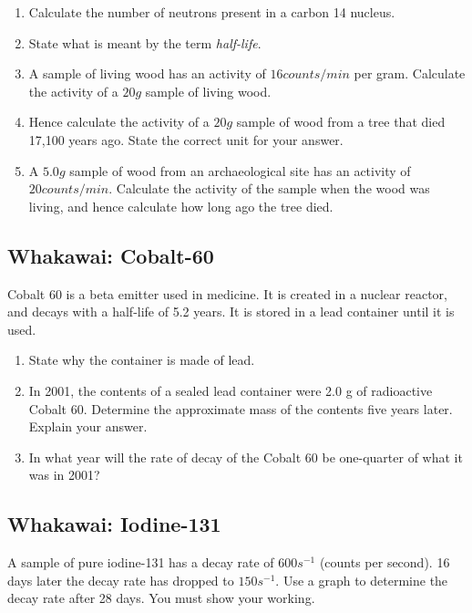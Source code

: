 \documentclass[12pt]{report}
\begin{document}
{\begin{enumerate}[itemsep=1.5cm]
	\item Calculate the number of neutrons present in a carbon 14 nucleus.
	\item State what is meant by the term \textit{half-life}.
	\item A sample of living wood has an activity of $16counts/min$ per gram. Calculate the activity of a $20g$ sample of living wood.
	\item Hence calculate the activity of a $20g$ sample of wood from a tree that died 17,100 years ago. State the correct unit for your answer.\vspace{2cm}
	\item A $5.0g$ sample of wood from an archaeological site has an activity of $20counts/min$. Calculate the activity of the sample when the wood was living, and hence calculate how long ago the tree died.\vspace{2cm}
\end{enumerate}

\newpage
\subsection{Whakawai: Cobalt-60}
Cobalt 60 is a beta emitter used in medicine. It is created in a nuclear reactor, and decays with a half-life of 5.2 years. It is stored in a lead container until it is used.

\begin{enumerate}
	\item State why the container is made of lead.\vspace{1.5cm}
	\item In 2001, the contents of a sealed lead container were 2.0 g of radioactive Cobalt 60. Determine the approximate mass of the contents five years later. Explain your answer.\vspace{3cm}
	\item In what year will the rate of decay of the Cobalt 60 be one-quarter of what it was in 2001? \vspace{2cm}
\end{enumerate}

\newpage
\subsection{Whakawai: Iodine-131}
A sample of pure iodine-131 has a decay rate of $600s^{-1}$ (counts per second). 16 days later the decay rate has dropped to $150s^{-1}$.  Use a graph to determine the decay rate after 28 days. You must show your working.

}
\end{document}
